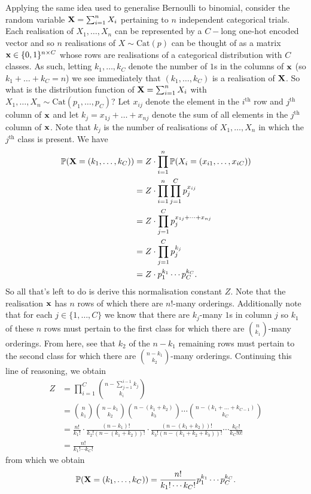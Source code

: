 \documentclass[11pt]{article}
\begin{document}
\begin{appendices}
Applying the same idea used to generalise Bernoulli to binomial, consider the random variable $\mathbf{X}=\sum_{i=1}^nX_i$ pertaining to $n$ independent categorical trials. Each realisation of $X_1,\dots,X_n$ can be represented by a $C-$long one-hot encoded vector and so $n$ realisations of $X\sim\text{Cat}(p)$ can be thought of as a matrix $\mathbf{x}\in\{0,1\}^{n\times C}$ whose rows are realisations of a categorical distribution with $C$ classes. As such, letting $k_1,\dots,k_C$ denote the number of $1$s in the columns of $\mathbf{x}$ (so $k_1+\dots+k_C=n$) we see immediately that $(k_1,\dots,k_C)$ is a realisation of $\mathbf{X}$. So what is the distribution function of $\mathbf{X}=\sum_{i=1}^nX_i$ with $X_1,\dots,X_n\sim\text{Cat}(p_1,\dots,p_C)$? Let $x_{ij}$ denote the element in the $i^{\text{th}}$ row and $j^{\text{th}}$ column of $\mathbf{x}$ and let $k_j=x_{1j}+\dots+x_{nj}$ denote the sum of all elements in the $j^{\text{th}}$ column of $\mathbf{x}$. Note that $k_j$ is the number of realisations of $X_1,\dots,X_n$ in which the $j^{\text{th}}$ class is present. We have
\begin{align*}
    \mathbb{P}(\mathbf{X}=(k_1,\dots,k_C))
    &=
    Z\cdot\prod_{i=1}^n\mathbb{P}(X_i=(x_{i1},\dots,x_{iC}))\\
    &=
    Z\cdot\prod_{i=1}^n\prod_{j=1}^Cp_j^{x_{ij}}\\
    &=
    Z\cdot\prod_{j=1}^Cp_j^{x_{1j}+\dots+x_{nj}}\\
    &=
    Z\cdot\prod_{j=1}^Cp_j^{k_j}\\
    &=
    Z\cdot p_1^{k_1}\cdots p_C^{k_C}.
\end{align*}
So all that's left to do is derive this normalisation constant $Z$. Note that the realisation $\mathbf{x}$ has $n$ rows of which there are $n!$-many orderings. Additionally note that for each $j\in\{1,\dots,C\}$ we know that there are $k_j$-many $1$s in column $j$ so $k_1$ of these $n$ rows must pertain to the first class for which there are $\binom{n}{k_1}$-many orderings. From here, see that $k_2$ of the $n-k_1$ remaining rows must pertain to the second class for which there are $\binom{n-k_1}{k_2}$-many orderings. Continuing this line of reasoning, we obtain
\begin{align*}
    Z
    &=
    \prod_{i=1}^C\binom{n-\sum_{j=1}^{i-1}k_j}{k_i}\\
    &=
    \binom{n}{k_1}\binom{n-k_1}{k_2}\binom{n-(k_1+k_2)}{k_3}\cdots\binom{n-(k_1+\dots+k_{C-1})}{k_C}\\
    &=
    \frac{n!}{k_1!}\cdot\frac{(n-k_1)!}{k_2!(n-(k_1+k_2))!}\cdot\frac{(n-(k_1+k_2))!}{k_3!(n-(k_1+k_2+k_3))!}\cdots\frac{k_C!}{k_C!0!}\\
    &=
    \frac{n!}{k_1!\cdots k_C!}
\end{align*}
from which we obtain
$$
\mathbb{P}(\mathbf{X}=(k_1,\dots,k_C))
=
\frac{n!}{k_1!\cdots k_C!}p_1^{k_1}\cdots p_C^{k_C}.
$$


\end{appendices}
\end{document}
